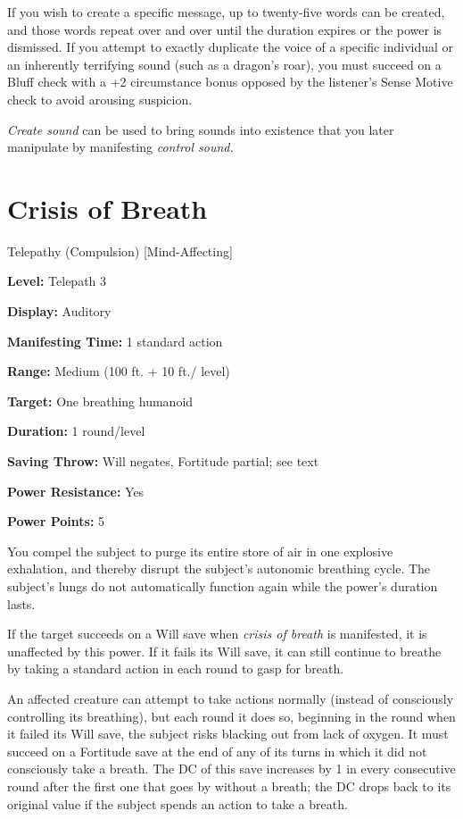 \documentclass{article}
\begin{document}
If you wish to create a specific message, up to twenty-five words can be created, 
and those words repeat over and over until the duration expires or the power is 
dismissed. If you attempt to exactly duplicate the voice of a specific individual 
or an inherently terrifying sound (such as a dragon's roar), you must succeed on 
a Bluff check with a +2 circumstance bonus opposed by the listener's Sense Motive 
check to avoid arousing suspicion.

\textit{Create sound }can be used to bring sounds into existence that you later 
manipulate by manifesting \textit{control sound.}

\vspace{12pt}
\section*{Crisis of Breath}

Telepathy (Compulsion) [Mind-Affecting]

\textbf{Level:} Telepath 3

\textbf{Display:} Auditory

\textbf{Manifesting Time:} 1 standard action

\textbf{Range:} Medium (100 ft. + 10 ft./ level)

\textbf{Target:} One breathing humanoid

\textbf{Duration:} 1 round/level

\textbf{Saving Throw:} Will negates, Fortitude partial; see text

\textbf{Power Resistance:} Yes

\textbf{Power Points:} 5

You compel the subject to purge its entire store of air in one explosive exhalation, 
and thereby disrupt the subject's autonomic breathing cycle. The subject's lungs 
do not automatically function again while the power's duration lasts.

If the target succeeds on a Will save when \textit{crisis of breath }is manifested, 
it is unaffected by this power. If it fails its Will save, it can still continue 
to breathe by taking a standard action in each round to gasp for breath.

An affected creature can attempt to take actions normally (instead of consciously 
controlling its breathing), but each round it does so, beginning in the round when 
it failed its Will save, the subject risks blacking out from lack of oxygen. It 
must succeed on a Fortitude save at the end of any of its turns in which it did 
not consciously take a breath. The DC of this save increases by 1 in every consecutive 
round after the first one that goes by without a breath; the DC drops back to its 
original value if the subject spends an action to take a breath.
\end{document}
